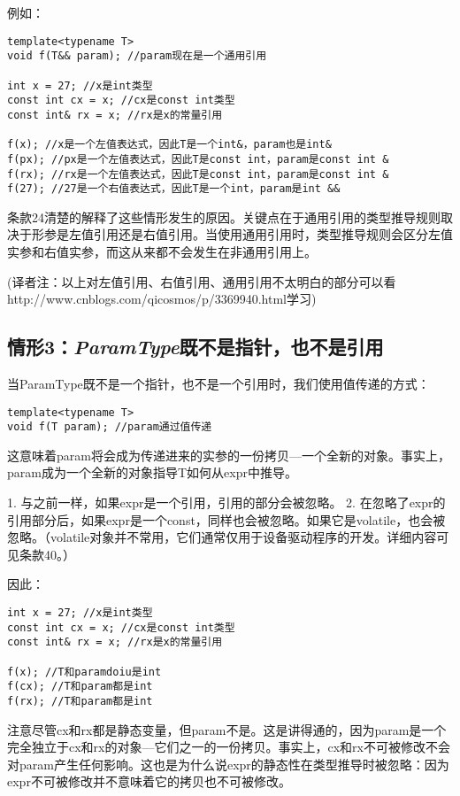 例如：
\begin{lstlisting}
template<typename T>
void f(T&& param); //param现在是一个通用引用

int x = 27; //x是int类型
const int cx = x; //cx是const int类型
const int& rx = x; //rx是x的常量引用

f(x); //x是一个左值表达式，因此T是一个int&，param也是int&
f(px); //px是一个左值表达式，因此T是const int，param是const int &
f(rx); //rx是一个左值表达式，因此T是const int，param是const int &
f(27); //27是一个右值表达式，因此T是一个int，param是int &&
\end{lstlisting}

条款24清楚的解释了这些情形发生的原因。关键点在于通用引用的类型推导规则取决于形参是左值引用还是右值引用。当使用通用引用时，类型推导规则会区分左值实参和右值实参，而这从来都不会发生在非通用引用上。

(译者注：以上对左值引用、右值引用、通用引用不太明白的部分可以看\\http://www.cnblogs.com/qicosmos/p/3369940.html学习)

\subsection*{情形3：\textit{ParamType}既不是指针，也不是引用}
当ParamType既不是一个指针，也不是一个引用时，我们使用值传递的方式：
\begin{lstlisting}
template<typename T>
void f(T param); //param通过值传递
\end{lstlisting}
这意味着param将会成为传递进来的实参的一份拷贝---一个全新的对象。事实上，param成为一个全新的对象指导T如何从expr中推导。

1. 与之前一样，如果expr是一个引用，引用的部分会被忽略。
2. 在忽略了expr的引用部分后，如果expr是一个const，同样也会被忽略。如果它是volatile，也会被忽略。（volatile对象并不常用，它们通常仅用于设备驱动程序的开发。详细内容可见条款40。）

因此：
\begin{lstlisting}
int x = 27; //x是int类型
const int cx = x; //cx是const int类型
const int& rx = x; //rx是x的常量引用

f(x); //T和paramdoiu是int
f(cx); //T和param都是int
f(rx); //T和param都是int
\end{lstlisting}

注意尽管cx和rx都是静态变量，但param不是。这是讲得通的，因为param是一个完全独立于cx和rx的对象---它们之一的一份拷贝。事实上，cx和rx不可被修改不会对param产生任何影响。这也是为什么说expr的静态性在类型推导时被忽略：因为expr不可被修改并不意味着它的拷贝也不可被修改。

